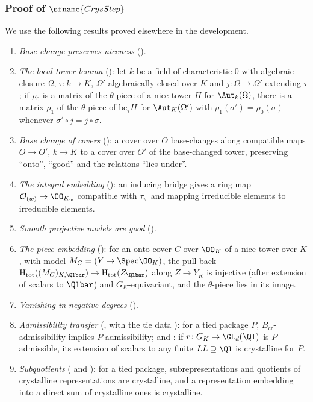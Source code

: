 \subsubsection{Proof of $\sfname{CrysStep}$}

We use the following results proved elsewhere in the development.
\begin{enumerate}[label=(\alph*),nosep]
\item \emph{Base change preserves niceness} ().
\item \emph{The local tower lemma} (): let $k$ be a field of
  characteristic $0$ with algebraic closure $\Omega$, $\tau\colon k\to K$, $\Omega'$ algebraically closed over $K$ and
  $j\colon\Omega\to\Omega'$ extending $\tau$; if $\rho_0$ is a matrix of the $\theta$-piece of a nice tower $H$ for
  $\Aut_k(\Omega)$, there is a matrix $\rho_1$ of the $\theta$-piece of $\mathrm{bc}_\tau H$ for $\Aut_K(\Omega')$ with
  $\rho_1(\sigma')=\rho_0(\sigma)$ whenever $\sigma'\circ j=j\circ\sigma$.
\item \emph{Base change of covers} (): a cover over $O$ base-changes along
  compatible maps $O\to O'$, $k\to K$ to a cover over $O'$ of the base-changed tower, preserving ``onto'', ``good'' and the
  relations ``lies under''.
\item \emph{The integral embedding} (): an inducing bridge gives a ring map
  $\stepsIOw\to\OO_{K_w}$ compatible with $\tau_w$ and mapping irreducible elements to irreducible elements.
\item \emph{Smooth projective models are good} ().
\item \emph{The piece embedding} (): for an onto cover $C$ over $\OO_K$ of a
  nice tower over $K$, with model $M_C=(Y\to\Spec\OO_K)$, the pull-back $\stepsIHtot((M_C)_{K,\Qlbar})\to\stepsIHtot(Z_{\Qlbar})$
  along $Z\to Y_K$ is injective (after extension of scalars to $\Qlbar$) and $G_K$-equivariant, and the $\theta$-piece lies
  in its image.
\item \emph{Vanishing in negative degrees} ().
\item \emph{Admissibility transfer} (, with the tie data
  ): for a tied package $P$, $B_{\mathrm{cr}}$-admissibility implies
  $P$-admissibility; and : if $r\colon G_K\to\GL_d(\Ql)$ is
  $P$-admissible, its extension of scalars to any finite $LL\supseteq\Ql$ is crystalline for $P$.
\item \emph{Subquotients} ( and
  ): for a tied package, subrepresentations and quotients of
  crystalline representations are crystalline, and a representation embedding into a direct sum of crystalline ones is
  crystalline.
\end{enumerate}

